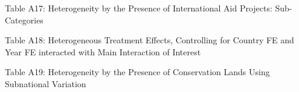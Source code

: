 \documentclass[pdf,letterpaper,11pt]{article}
\begin{document}
 \begin{table}[H]  \centering
   \begin{scriptsize}
\begin{threeparttable}
\caption*{Table A17: Heterogeneity by the Presence of International Aid Projects: Sub-Categories}
 
   \end{threeparttable}
      \end{scriptsize}
\end{table}


\begin{table} [tbp]  \centering
   \begin{scriptsize}
\begin{threeparttable}
\caption*{Table A18: Heterogeneous Treatment Effects, Controlling for Country FE and Year FE interacted with Main Interaction of Interest }
 
 
 
 
 
   \end{threeparttable}
      \end{scriptsize}
\end{table}


 \begin{table}[H]  \centering
   \begin{scriptsize}
\begin{threeparttable}
\caption*{Table A19: Heterogeneity by the Presence of Conservation Lands Using Subnational Variation}
 
   \end{threeparttable}
      \end{scriptsize}
\end{table}
\end{document}
